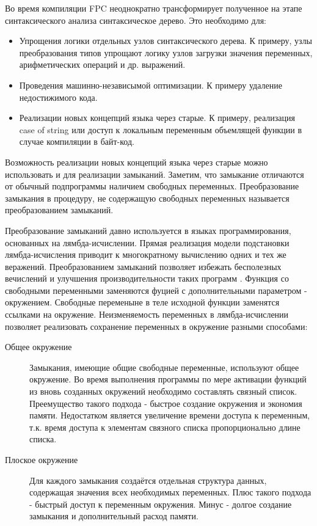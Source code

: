 \documentclass{imcs}
\begin{document}
Во время компиляции FPC неоднократно трансформирует полученное на этапе синтаксического 
анализа синтаксическое дерево. Это необходимо для:
\begin{itemize}
    \item Упрощения логики отдельных узлов синтаксического дерева. К 
примеру, узлы преобразования типов упрощают логику узлов загрузки значения переменных,
арифметических операций и др. выражений.
    \item Проведения машинно-независымой оптимизации. К примеру удаление недостижимого
кода.
    \item Реализации новых концепций языка через старые. К примеру, реализация
case of string\cite{misha} или доступ к локальным переменным объемлящей функции в
случае компиляции в байт-код.
\end{itemize}      

Возможность реализации новых концепций языка через старые можно использовать и
для реализации замыканий. Заметим, что замыкание отличаются от 
обычный подпрограммы наличием свободных переменных. Преобразование
замыкания в процедуру, не содержащую свободных переменных называется преобразованием
замыканий\cite{moderncompiler}.

Преобразование замыканий давно используется в языках программирования, основанных на
лямбда-исчислении. Прямая реализация модели подстановки
лямбда-исчисления приводит к многократному вычислению одних и тех же веражений.
Преобразованием замыканий позволяет избежать бесполезных вечислений
и улучшения производительности таких программ \cite{lambdaclosure95}. 
Функция со свободными переменными
заменяются фуцией с дополнительными параметром - окружением. Свободные переменыне
в теле исходной функции заменятся ссылками на окружение.  
Неизменяемость переменных в лямбда-исчислении позволяет реализовать сохранение
переменных в окружение разными способами:
\begin{description}
    \item[Общее окружение] Замыкания, имеющие общие свободные переменные,
используют общее окружение. Во время выполнения программы по мере активации функций
из вновь созданных окружений необходимо составлять связный список.
Преемущество такого подхода - быстрое создание окружения и экономия памяти. Недостатком
является увеличение времени доступа к переменным, т.к. время доступа к элементам связного
списка пропорционально длине списка.
    \item[Плоское окружение] Для каждого замыкания создаётся отдельная структура данных,
содержащая значения всех необходимых переменных. Плюс такого подхода - быстрый доступ
к переменным окружения. Минус - долгое создание замыкания и дополнительный расход памяти.
\end{description}
\end{document}

